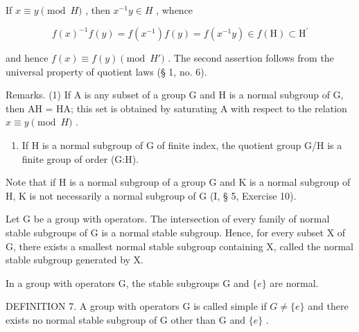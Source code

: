 If \(x \equiv y \pmod{H}\) , then \(x^{-1}y \in H\) , whence

\[
f (x) ^ {- 1} f (y) = f \left(x ^ {- 1}\right) f (y) = f \left(x ^ {- 1} y\right) \in f (\mathrm{H}) \subset \mathrm{H} ^ {\prime}
\]

and hence \(f(x) \equiv f(y) \pmod{H'}\) . The second assertion follows from the universal property of quotient laws (§ 1, no. 6).

Remarks. (1) If A is any subset of a group G and H is a normal subgroup of G, then AH = HA; this set is obtained by saturating A with respect to the relation \(x \equiv y \pmod{H}\) .

\begin{enumerate}
\def\labelenumi{(\arabic{enumi})}
\setcounter{enumi}{1}
\tightlist
\item
  If H is a normal subgroup of G of finite index, the quotient group G/H is a finite group of order (G:H).
\end{enumerate}

Note that if H is a normal subgroup of a group G and K is a normal subgroup of H, K is not necessarily a normal subgroup of G (I, § 5, Exercise 10).

Let G be a group with operators. The intersection of every family of normal stable subgroups of G is a normal stable subgroup. Hence, for every subset X of G, there exists a smallest normal stable subgroup containing X, called the normal stable subgroup generated by X.

In a group with operators G, the stable subgroups G and \(\{e\}\) are normal.

DEFINITION 7. A group with operators G is called simple if \(G \neq \{e\}\) and there exists no normal stable subgroup of G other than G and \(\{e\}\) .

